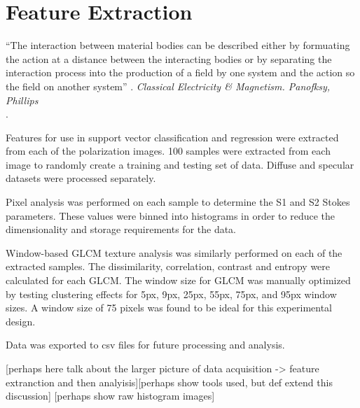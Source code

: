 \chapter{Feature Extraction}
\begin{center}
  \begin{minipage}{0.75\textwidth}
    \begin{small}
      “The interaction between material bodies can be described either by formuating the action at a distance between the interacting bodies or by separating the interaction process into the production of a field by one system and the action so the field on another system” .
      \emph{Classical Electricity \& Magnetism. Panofksy, Phillips}\\.
    \end{small}
  \end{minipage}
  \vspace{0.5cm}
\end{center}

Features for use in support vector classification and regression were extracted from each of the polarization images.  100 samples were extracted from each image to randomly create a training and testing set of data.  Diffuse and specular datasets were processed separately.

Pixel analysis was performed on each sample to determine the S1 and S2 Stokes parameters.  These values were binned into histograms in order to reduce the dimensionality and storage requirements for the data.

Window-based GLCM texture analysis was similarly performed on each of the extracted samples.  The dissimilarity, correlation, contrast and entropy were calculated for each GLCM.  The window size for GLCM was manually optimized by testing clustering effects for 5px, 9px, 25px, 55px, 75px, and 95px window sizes.  A window size of 75 pixels was found to be ideal for this experimental design.

Data was exported to csv files for future processing and analysis.

[perhaps here talk about the larger picture of data acquisition -> feature extranction and then analyisis][perhaps show tools used, but def extend this discussion]
[perhaps show raw histogram images]
